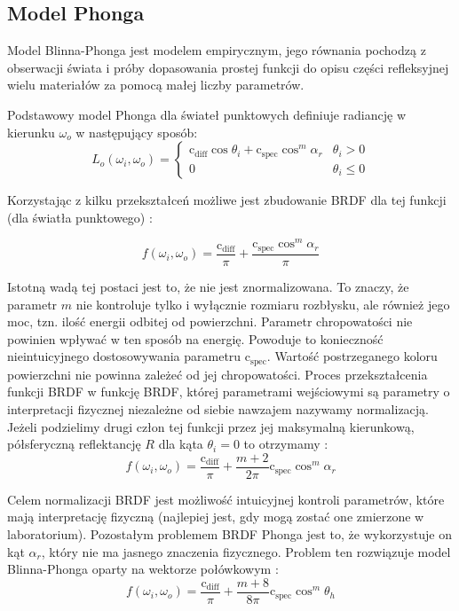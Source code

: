 \documentclass[../main.tex]{subfiles}
\newcommand{\cdiff}{\text{c}_{\text{diff}}}
\newcommand{\cspec}{\text{c}_{\text{spec}}}
\begin{document}
\subsection{Model Phonga}

Model Blinna-Phonga jest modelem empirycznym, jego równania pochodzą z obserwacji świata i próby dopasowania prostej funkcji do opisu części refleksyjnej wielu materiałów za pomocą małej liczby parametrów.

Podstawowy model Phonga dla świateł punktowych definiuje radiancję w kierunku $\omega_o$ w następujący sposób:
\begin{equation}
L_{o}(\omega_i, \omega_o) = \begin{cases}
\cdiff \cos\theta_i + \cspec \cos^{m}{\alpha_r} & \theta_i > 0 \\
0 & \theta_i \leq 0
\end{cases}
\end{equation}

Korzystając z kilku przekształceń możliwe jest zbudowanie BRDF dla tej funkcji (dla światła punktowego) \cite{RealTimeRendering2008}:

\begin{equation}
f(\omega_i, \omega_o) = \frac{\cdiff}{\pi} + \frac{\cspec \cos^{m} \alpha_r}{\pi}
\end{equation}

Istotną wadą tej postaci jest to, że nie jest znormalizowana. To znaczy, że parametr $m$ nie kontroluje tylko i wyłącznie rozmiaru rozbłysku, ale również jego moc, tzn. ilość energii odbitej od powierzchni. Parametr chropowatości nie powinien wpływać w ten sposób na energię. Powoduje to konieczność nieintuicyjnego dostosowywania parametru $\cspec$. Wartość postrzeganego koloru powierzchni nie powinna zależeć od jej chropowatości. Proces przekształcenia funkcji BRDF w funkcję BRDF, której parametrami wejściowymi są parametry o interpretacji fizycznej niezależne od siebie nawzajem nazywamy normalizacją.  Jeżeli podzielimy drugi człon tej funkcji przez jej maksymalną kierunkową, półsferyczną reflektancję $R$ dla kąta $\theta_i = 0$ to otrzymamy \cite{RealTimeRendering2008}:
\begin{equation}
  f(\omega_i, \omega_o) = \frac{\cdiff}{\pi} + \frac{m+2}{2\pi} {\cspec \cos^{m} \alpha_r}
\end{equation}

Celem normalizacji BRDF jest możliwość intuicyjnej kontroli parametrów, które mają interpretację fizyczną (najlepiej jest, gdy mogą zostać one zmierzone w laboratorium). Pozostałym problemem BRDF Phonga jest to, że wykorzystuje on kąt $\alpha_r$, który nie ma jasnego znaczenia fizycznego. Problem ten rozwiązuje model Blinna-Phonga oparty na wektorze połówkowym \cite{RealTimeRendering2008}:
\begin{equation}
  f(\omega_i, \omega_o) = \frac{\cdiff}{\pi} + \frac{m+8}{8\pi} {\cspec \cos^{m} \theta_h}
\end{equation}
\end{document}
